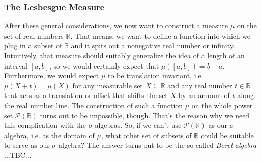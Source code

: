 \subsubsection{The Lesbesgue Measure}
After these general considerations, we now want to construct a measure $\mu$ on the set of real numbers $\mathbb{R}$. That means, we want to define a function into which we plug in a subset of $\mathbb{R}$ and it spits out a nonegative real number or infinity. Intuitively, that measure should suitably generalize the idea of a length of an interval $[a,b]$, so we would certainly expect that $\mu([a,b]) = b-a$. Furthermore, we would expect $\mu$ to be translation invariant, i.e. $\mu(X + t) = \mu(X)$ for any measurable set $X \subseteq \mathbb{R}$ and any real number $t \in \mathbb{R}$ that acts as a translation or offset that shifts the set $X$ by an amount of $t$ along the real number line. The construction of such a function $\mu$ on the whole power set $\mathcal{P}(\mathbb{R})$ turns out to be impossible, though. That's the reason why we need this complication with the $\sigma$-algebras. So, if we can't use $\mathcal{P}(\mathbb{R})$ as our $\sigma$-algebra, i.e. as the domain of $\mu$, what other set of subsets of $\mathbb{R}$ could be suitable to serve as our $\sigma$-algebra? The answer turns out to be the so called \emph{Borel algebra} ...TBC...










